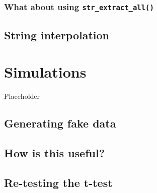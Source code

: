 \documentclass[
]{book}
\begin{document}
\hypertarget{what-about-using-str_extract_all}{%
\subsection{\texorpdfstring{What about using \texttt{str\_extract\_all()}}{What about using str\_extract\_all()}}\label{what-about-using-str_extract_all}}

\hypertarget{string-interpolation}{%
\section{String interpolation}\label{string-interpolation}}

\hypertarget{simulations}{%
\chapter{Simulations}\label{simulations}}

Placeholder

\hypertarget{generating-fake-data}{%
\section{Generating fake data}\label{generating-fake-data}}

\hypertarget{how-is-this-useful}{%
\section{How is this useful?}\label{how-is-this-useful}}

\hypertarget{re-testing-the-t-test}{%
\section{Re-testing the t-test}\label{re-testing-the-t-test}}

  
\end{document}
